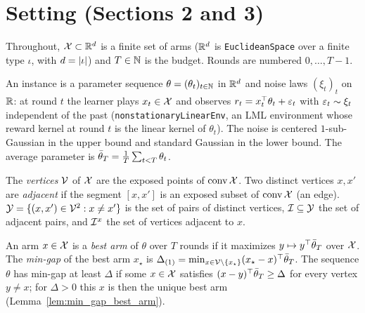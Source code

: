 \chapter{Setting (Sections 2 and 3)}
\label{chap:setting}

Throughout, $\mathcal{X} \subset \mathbb{R}^d$ is a finite set of arms ($\mathbb{R}^d$ is \texttt{EuclideanSpace} over a finite type $\iota$, with
$d = \lvert \iota \rvert$) and $T \in \mathbb{N}$ is the budget. Rounds are numbered $0, \dots, T - 1$.

\begin{definition}
  \label{def:setting}
  \leanok
  An instance is a parameter sequence $\theta = (\theta_t)_{t \in \mathbb{N}}$ in $\mathbb{R}^d$ and noise laws
  $(\xi_t)_t$ on $\mathbb{R}$: at round $t$ the learner plays $x_t \in \mathcal{X}$ and observes
  $r_t = x_t^\top \theta_t + \varepsilon_t$ with $\varepsilon_t \sim \xi_t$ independent of the past
  (\texttt{nonstationaryLinearEnv}, an LML environment whose reward kernel at round $t$ is
  the linear kernel of $\theta_t$). The noise is centered $1$-sub-Gaussian in the upper bound and
  standard Gaussian in the lower bound. The average parameter is
  $\bar{\theta}_T = \frac1T \sum_{t < T} \theta_t$.
\end{definition}

\begin{definition}
  \label{def:adjacency}
  \leanok
  The \emph{vertices} $\mathcal{V}$ of $\mathcal{X}$ are the exposed points of $\operatorname{conv} \mathcal{X}$. Two distinct vertices
  $x, x'$ are \emph{adjacent} if the segment $[x, x']$ is an exposed subset of $\operatorname{conv} \mathcal{X}$ (an edge).
  $\mathcal{Y} = \{(x, x') \in \mathcal{V}^2 : x \ne x'\}$ is the set of pairs of distinct vertices,
  $\mathcal{I} \subseteq \mathcal{Y}$ the set of adjacent pairs, and $\mathcal{I}^x$ the set of vertices adjacent to $x$.
\end{definition}

\begin{definition}
  \label{def:min_gap}
  \leanok
  An arm $x \in \mathcal{X}$ is a \emph{best arm} of $\theta$ over $T$ rounds if it maximizes
  $y \mapsto y^\top \bar{\theta}_T$ over $\mathcal{X}$. The \emph{min-gap} of the best arm $x_\star$ is
  $\Delta_{(1)} = \min_{x \in \mathcal{V} \setminus \{x_\star\}} (x_\star - x)^\top \bar{\theta}_T$. The sequence
  $\theta$ has min-gap at least $\Delta$ if some $x \in \mathcal{X}$ satisfies $(x - y)^\top \bar{\theta}_T \ge
  \Delta$ for every vertex $y \ne x$; for $\Delta > 0$ this $x$ is then the unique best arm
  (Lemma~\ref{lem:min_gap_best_arm}).
\end{definition}

